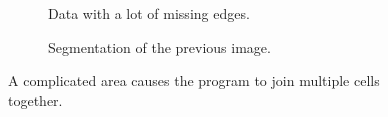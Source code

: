 \documentclass[
  digital,     %
  oneside,     %
  nosansbold,  %
  nocolorbold, %
  lof,         %
  lot,         %
]{fithesis4}
\begin{document}
\begin{figure}
    \begin{subfigure}[t]{0.3\linewidth}
        \caption{Data with a lot of missing edges.}
    \end{subfigure}
    \begin{subfigure}[t]{0.3\linewidth}
        \caption{Segmentation of the previous image.}
    \end{subfigure}
    \caption{A complicated area causes the program to join multiple cells together.}
    \label{fig:issues-joining}
\end{figure}
\end{document}
